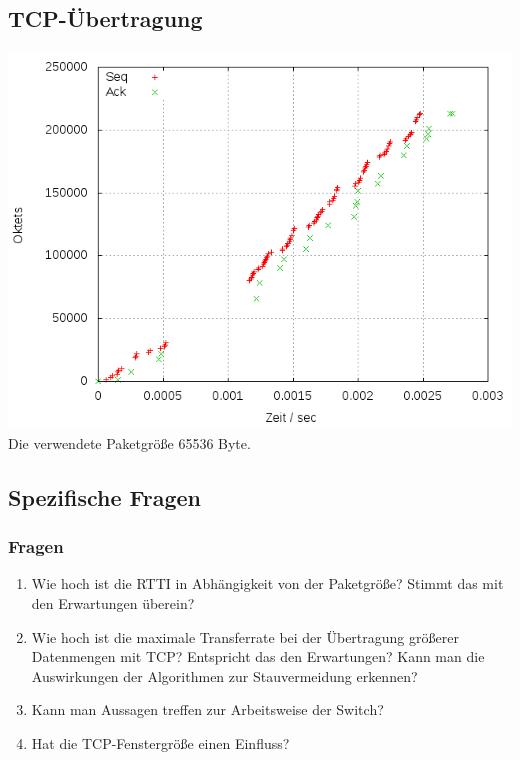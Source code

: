 \documentclass[a4paper,10pt]{article}
\begin{document}
\subsection{TCP-Übertragung}
\includegraphics[scale=0.75]{setup1.png}
Die verwendete Paketgröße 65536 Byte.

\subsection{Spezifische Fragen}
\subsubsection{Fragen}
\begin{enumerate}
 \item Wie hoch ist die RTTI in Abhängigkeit von der Paketgröße? Stimmt das mit den Erwartungen überein?
 \item Wie hoch ist die maximale Transferrate bei der Übertragung größerer Datenmengen mit TCP? Entspricht das den Erwartungen? Kann man die Auswirkungen der Algorithmen zur Stauvermeidung erkennen?
 \item Kann man Aussagen treffen zur Arbeitsweise der Switch?
 \item Hat die TCP-Fenstergröße einen Einfluss?
\end{enumerate}
\end{document}
